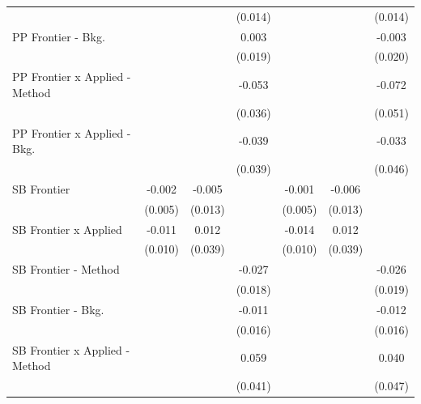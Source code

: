 \begin{tabular}{lcccccc}
                                  &              &              & (0.014)        &              &         & (0.014)\\   
   PP Frontier - Bkg.             &              &              & 0.003          &              &         & -0.003\\   
                                  &              &              & (0.019)        &              &         & (0.020)\\   
   PP Frontier x Applied - Method &              &              & -0.053         &              &         & -0.072\\   
                                  &              &              & (0.036)        &              &         & (0.051)\\   
   PP Frontier x Applied - Bkg.   &              &              & -0.039         &              &         & -0.033\\   
                                  &              &              & (0.039)        &              &         & (0.046)\\   
   SB Frontier                    & -0.002       & -0.005       &                & -0.001       & -0.006  &   \\   
                                  & (0.005)      & (0.013)      &                & (0.005)      & (0.013) &   \\   
   SB Frontier x Applied          & -0.011       & 0.012        &                & -0.014       & 0.012   &   \\   
                                  & (0.010)      & (0.039)      &                & (0.010)      & (0.039) &   \\   
   SB Frontier - Method           &              &              & -0.027         &              &         & -0.026\\   
                                  &              &              & (0.018)        &              &         & (0.019)\\   
   SB Frontier - Bkg.             &              &              & -0.011         &              &         & -0.012\\   
                                  &              &              & (0.016)        &              &         & (0.016)\\   
   SB Frontier x Applied - Method &              &              & 0.059          &              &         & 0.040\\   
                                  &              &              & (0.041)        &              &         & (0.047)\\   

\end{tabular}

